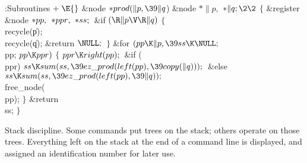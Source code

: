 \Y\B\4:Subroutines\X${}\mathrel+\E{}$\6
\&{node} ${}{*}\\{prod}(\|p,\39\|q{}$)\1\1\6
\&{node} ${}{*}\|p,{}$ ${}{*}\|q;\2\2{}$\6
${}\{{}$\1\6
\&{register} \&{node} ${}{*}\\{pp},{}$ ${}{*}\\{ppr},{}$ ${}{*}\\{ss};{}$\7
\&{if} ${}(\R\|p\V\R\|q){}$\5
${}\{{}$\1\6
\\{recycle}(\|p);\6
\\{recycle}(\|q);\6
\&{return} ${}\NULL;{}$\6
\4${}\}{}$\2\6
\&{for} ${}(\\{pp}\K\|p,\39\\{ss}\K\NULL;{}$ \\{pp}; ${}\\{pp}\K\\{ppr}){}$\5
${}\{{}$\1\6
${}\\{ppr}\K\\{right}(\\{pp});{}$\6
\&{if} (\\{ppr})\1\5
${}\\{ss}\K\\{sum}(\\{ss},\39\\{ez\_prod}(\\{left}(\\{pp}),\39\\{copy}(%
\|q)));{}$\2\6
\&{else}\1\5
${}\\{ss}\K\\{sum}(\\{ss},\39\\{ez\_prod}(\\{left}(\\{pp}),\39\|q));{}$\2\6
\\{free\_node}(\\{pp});\6
\4${}\}{}$\2\6
\&{return} \\{ss};\6
\4${}\}{}$\2\par
\fi

Stack discipline. Some commands put trees on the stack; others operate
on those trees. Everything left on the stack at the end of a command line
is displayed, and assigned an identification number for later use.

